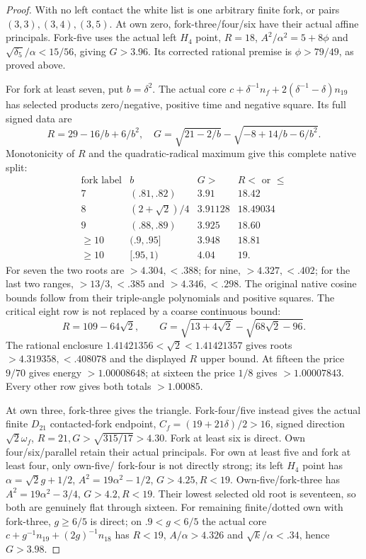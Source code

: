 \begin{proof}
With no left contact the white list is one arbitrary finite fork,
or pairs $(3,3),(3,4),(3,5)$. At own zero, fork-three/four/six
have their actual affine principals. Fork-five uses the actual
left $H_4$ point, $R=18$, $A^2/\alpha^2=5+8\phi$ and
$\sqrt{\delta_5}/\alpha<15/56$, giving $G>3.96$.
Its corrected rational premise is $\phi>79/49$, as proved above.

For fork at least seven, put $b=\delta^2$. The actual core
$c+\delta^{-1}n_f+2(\delta^{-1}-\delta)n_{19}$ has selected
products zero/negative, positive time and negative square.
Its full signed data are
\[
 R=29-16/b+6/b^2,\quad
 G=\sqrt{21-2/b}-\sqrt{-8+14/b-6/b^2}.
\]
Monotonicity of $R$ and the quadratic-radical maximum give this
complete native split:
\[
\begin{array}{c|c|c|c}
\text{fork label}&b&G>&R<\text{ or }\le\\\hline
7&(.81,.82)&3.91&18.42\\
8&(2+\sqrt2)/4&3.91128&18.49034\\
9&(.88,.89)&3.925&18.60\\
\ge10&(.9,.95]&3.948&18.81\\
\ge10&[.95,1)&4.04&19 .
\end{array}
\]
For seven the two roots are $>4.304,<.388$; for nine,
$>4.327,<.402$; for the last two ranges, $>13/3,<.385$ and
$>4.346,<.298$. The original native cosine bounds follow from
their triple-angle polynomials and positive squares.
The critical eight row is not replaced by a coarse continuous bound:
\[
 R=109-64\sqrt2,\qquad
 G=\sqrt{13+4\sqrt2}-\sqrt{68\sqrt2-96}.
\]
The rational enclosure $1.41421356<\sqrt2<1.41421357$ gives
roots $>4.319358,<.408078$ and the displayed $R$ upper bound.
At fifteen the price $9/70$ gives energy $>1.00008648$;
at sixteen the price $1/8$ gives $>1.00007843$.
Every other row gives both totals $>1.00085$.

At own three, fork-three gives the triangle. Fork-four/five instead
gives the actual finite $D_{21}$ contacted-fork endpoint,
$C_f=(19+21\delta)/2>16$, signed direction $\sqrt2\omega_f$,
$R=21,G>\sqrt{315/17}>4.30$. Fork at least six is direct.
Own four/six/parallel retain their actual principals.
For own at least five and fork at least four, only own-five/
fork-four is not directly strong; its left $H_4$ point has
$\alpha=\sqrt2g+1/2$, $A^2=19\alpha^2-1/2$, $G>4.25,R<19$.
Own-five/fork-three has $A^2=19\alpha^2-3/4$, $G>4.2,R<19$.
Their lowest selected old root is seventeen, so both are genuinely
flat through sixteen. For remaining finite/dotted own with fork-three,
$g\ge6/5$ is direct; on $.9<g<6/5$ the actual core
$c+g^{-1}n_{19}+(2g)^{-1}n_{18}$ has $R<19$,
$A/\alpha>4.326$ and $\sqrt{k}/\alpha<.34$, hence $G>3.98$.


\end{proof}
